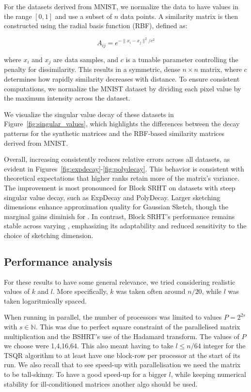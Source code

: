 \documentclass[a4paper, 12pt,oneside]{article}
\begin{document}
For the datasets derived from MNIST, we normalize the data to have values in the range \([0, 1]\) and use a subset of \( n \) data points. A similarity matrix is then constructed using the radial basis function (RBF), defined as:

\[
A_{ij} = e^{-\|x_i - x_j\|^2 / c^2}
\]

where \( x_i \) and \( x_j \) are data samples, and \( c \) is a tunable parameter controlling the penalty for dissimilarity. This results in a symmetric, dense \( n \times n \) matrix, where \( c \) determines how rapidly similarity decreases with distance. To ensure consistent computations, we normalize the MNIST dataset by dividing each pixel value by the maximum intensity across the dataset.

We visualize the singular value decay of these datasets in Figure~\ref{fig:singular_values}, which highlights the differences between the decay patterns for the synthetic matrices and the RBF-based similarity matrices derived from MNIST.

	Overall, increasing  consistently reduces relative errors across all datasets, as evident in Figures~\ref{fig:expdecay}-\ref{fig:polydecay}. This behavior is consistent with theoretical expectations that higher ranks retain more of the matrix’s variance. The improvement is most pronounced for Block SRHT on datasets with steep singular value decay, such as ExpDecay and PolyDecay. Larger sketching dimensions  enhance approximation quality for Gaussian Sketch, though the marginal gains diminish for . In contrast, Block SRHT’s performance remains stable across varying , emphasizing its adaptability and reduced sensitivity to the choice of sketching dimension.
		\subsection{Performance analysis}
		For these results to have some general relevance, we tried considering realistic values of $k$ and $l$. More specifically, $k$ was taken often around $n/20$, while $l$ was taken logaritmically spaced.
	
		When running in parallel, the number of processors was limited to values $P=2^{2s}$ with $s\in\mathbb{N}$. This was due to perfect square constraint of the parallelised matrix multiplication and the BSHRT's use of the Hadamard transform. The values of $P$ we choose were 1,4,16,64. 		
		This also meant having to take $l\le n/64$ integer for the TSQR algorithm to at least have one block-row per processor at the start of its run. We also recall that to see speed-up with parallelisation we need the matrix to be tall-skinny. To have a good speed-up for a bigger $l$, while keeping numerical stability for ill-conditioned matrices another algo should be used.
\end{document}
